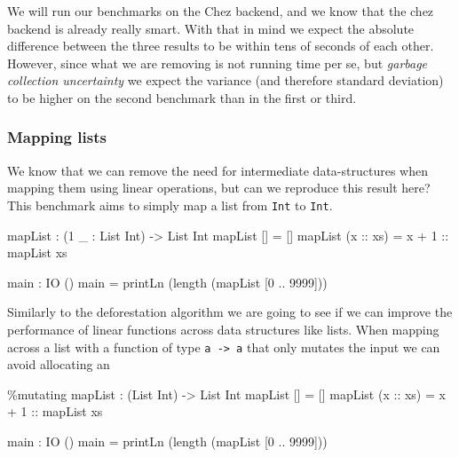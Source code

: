 \documentclass[
]{article}
\newenvironment{Shaded}{}{}
\newcommand{\DataTypeTok}[1]{\textcolor[rgb]{0.56,0.13,0.00}{#1}}
\newcommand{\DecValTok}[1]{\textcolor[rgb]{0.25,0.63,0.44}{#1}}
\newcommand{\FunctionTok}[1]{\textcolor[rgb]{0.02,0.16,0.49}{#1}}
\newcommand{\NormalTok}[1]{#1}
\newcommand{\OperatorTok}[1]{\textcolor[rgb]{0.40,0.40,0.40}{#1}}
\newcommand{\OtherTok}[1]{\textcolor[rgb]{0.00,0.44,0.13}{#1}}
\begin{document}
We will run our benchmarks on the Chez backend, and we know that the
chez backend is already really smart. With that in mind we expect the
absolute difference between the three results to be within tens of
seconds of each other. However, since what we are removing is not
running time per se, but \emph{garbage collection uncertainty} we expect
the variance (and therefore standard deviation) to be higher on the
second benchmark than in the first or third.

\hypertarget{mapping-lists}{%
\subsubsection{Mapping lists}\label{mapping-lists}}

We know that we can remove the need for intermediate data-structures
when mapping them using linear operations\cite{deforestation}, but can
we reproduce this result here? This benchmark aims to simply map a list
from \texttt{Int} to \texttt{Int}.

\begin{Shaded}
\begin{Highlighting}[]
\NormalTok{mapList }\OperatorTok{:}\NormalTok{ (}\DecValTok{1}\NormalTok{ \_ }\OperatorTok{:} \DataTypeTok{List} \DataTypeTok{Int}\NormalTok{) }\OtherTok{{-}\textgreater{}} \DataTypeTok{List} \DataTypeTok{Int}
\NormalTok{mapList [] }\OtherTok{=}\NormalTok{ []}
\NormalTok{mapList (}\OtherTok{x ::}\NormalTok{ xs) }\OtherTok{=}\NormalTok{ x }\OperatorTok{+} \DecValTok{1}\OtherTok{ ::}\NormalTok{ mapList xs}

\NormalTok{main }\OperatorTok{:} \DataTypeTok{IO}\NormalTok{ ()}
\NormalTok{main }\OtherTok{=}\NormalTok{ printLn (}\FunctionTok{length}\NormalTok{ (mapList [}\DecValTok{0} \OperatorTok{..} \DecValTok{9999}\NormalTok{]))}
\end{Highlighting}
\end{Shaded}

Similarly to the deforestation algorithm we are going to see if we can
improve the performance of linear functions across data structures like
lists. When mapping across a list with a function of type
\texttt{a\ -\textgreater{}\ a} that only mutates the input we can avoid
allocating an

\begin{Shaded}
\begin{Highlighting}[]
\OperatorTok{\%}\NormalTok{mutating}
\NormalTok{mapList }\OperatorTok{:}\NormalTok{ (}\DataTypeTok{List} \DataTypeTok{Int}\NormalTok{) }\OtherTok{{-}\textgreater{}} \DataTypeTok{List} \DataTypeTok{Int}
\NormalTok{mapList [] }\OtherTok{=}\NormalTok{ []}
\NormalTok{mapList (}\OtherTok{x ::}\NormalTok{ xs) }\OtherTok{=}\NormalTok{ x }\OperatorTok{+} \DecValTok{1}\OtherTok{ ::}\NormalTok{ mapList xs}

\NormalTok{main }\OperatorTok{:} \DataTypeTok{IO}\NormalTok{ ()}
\NormalTok{main }\OtherTok{=}\NormalTok{ printLn (}\FunctionTok{length}\NormalTok{ (mapList [}\DecValTok{0} \OperatorTok{..} \DecValTok{9999}\NormalTok{]))}
\end{Highlighting}
\end{Shaded}
\end{document}
